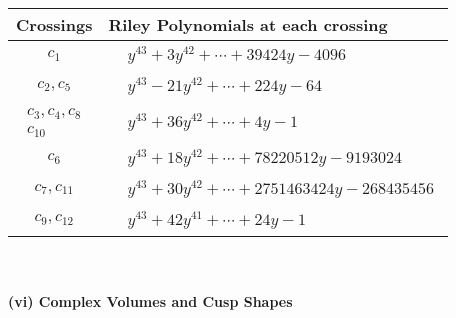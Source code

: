 \documentclass[1p]{elsarticle_modified}
\theoremstyle{definition}
\begin{document}
\begin{tabular}{m{50pt}|m{274pt}}
Crossings & \hspace{64pt}Riley Polynomials at each crossing \\
\hline $$\begin{aligned}c_{1}\end{aligned}$$&$\begin{aligned}
&y^{43}+3 y^{42}+\cdots+39424 y-4096
\end{aligned}$\\
\hline $$\begin{aligned}c_{2},c_{5}\end{aligned}$$&$\begin{aligned}
&y^{43}-21 y^{42}+\cdots+224 y-64
\end{aligned}$\\
\hline $$\begin{aligned}c_{3},c_{4},c_{8}\\c_{10}\end{aligned}$$&$\begin{aligned}
&y^{43}+36 y^{42}+\cdots+4 y-1
\end{aligned}$\\
\hline $$\begin{aligned}c_{6}\end{aligned}$$&$\begin{aligned}
&y^{43}+18 y^{42}+\cdots+78220512 y-9193024
\end{aligned}$\\
\hline $$\begin{aligned}c_{7},c_{11}\end{aligned}$$&$\begin{aligned}
&y^{43}+30 y^{42}+\cdots+2751463424 y-268435456
\end{aligned}$\\
\hline $$\begin{aligned}c_{9},c_{12}\end{aligned}$$&$\begin{aligned}
&y^{43}+42 y^{41}+\cdots+24 y-1
\end{aligned}$\\
\hline
\end{tabular}\\~\\
\newpage\flushleft \textbf{(vi) Complex Volumes and Cusp Shapes}
\end{document}
